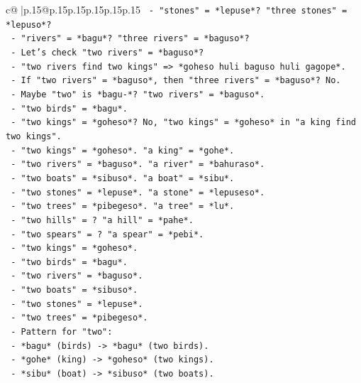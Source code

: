 \documentclass{article}
\begin{document}
{\begin{supertabular}{c@{$\;$}|p{.15\linewidth}@{}p{.15\linewidth}p{.15\linewidth}p{.15\linewidth}p{.15\linewidth}p{.15\linewidth}}
{{{\texttt{        {-}   "stones" = *lepuse*? "three stones" = *lepuso*?} \\
\texttt{        {-}   "rivers" = *bagu*? "three rivers" = *baguso*?} \\
\texttt{        {-}   Let's check "two rivers" = *baguso*?} \\
\texttt{        {-}   "two rivers find two kings" => *goheso huli baguso huli gagope*.} \\
\texttt{        {-}   If "two rivers" = *baguso*, then "three rivers" = *baguso*? No.} \\
\texttt{        {-}   Maybe "two" is *bagu{-}*? "two rivers" = *baguso*.} \\
\texttt{        {-}   "two birds" = *bagu*.} \\
\texttt{        {-}   "two kings" = *goheso*? No, "two kings" = *goheso* in "a king find two kings".} \\
\texttt{        {-}   "two kings" = *goheso*. "a king" = *gohe*.} \\
\texttt{        {-}   "two rivers" = *baguso*. "a river" = *bahuraso*.} \\
\texttt{        {-}   "two boats" = *sibuso*. "a boat" = *sibu*.} \\
\texttt{        {-}   "two stones" = *lepuse*. "a stone" = *lepuseso*.} \\
\texttt{        {-}   "two trees" = *pibegeso*. "a tree" = *lu*.} \\
\texttt{        {-}   "two hills" = ? "a hill" = *pahe*.} \\
\texttt{        {-}   "two spears" = ? "a spear" = *pebi*.} \\
\texttt{        {-}   "two kings" = *goheso*.} \\
\texttt{        {-}   "two birds" = *bagu*.} \\
\texttt{        {-}   "two rivers" = *baguso*.} \\
\texttt{        {-}   "two boats" = *sibuso*.} \\
\texttt{        {-}   "two stones" = *lepuse*.} \\
\texttt{        {-}   "two trees" = *pibegeso*.} \\
\texttt{        {-}   Pattern for "two":} \\
\texttt{            {-}   *bagu* (birds) {-}> *bagu* (two birds).} \\
\texttt{            {-}   *gohe* (king) {-}> *goheso* (two kings).} \\
\texttt{            {-}   *sibu* (boat) {-}> *sibuso* (two boats).} \\
}}}
\end{supertabular}}
\end{document}
